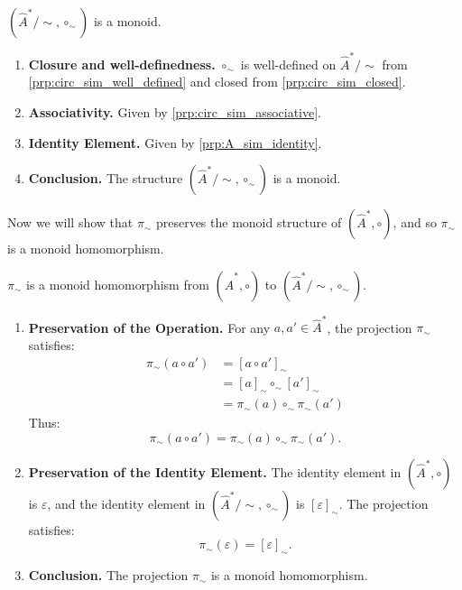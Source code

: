 \begin{propositionE}
\label{prp:A_sim_is_monoid}
    $(\hat{A}^{\ast}/\sim, \circ_{\sim})$ is a monoid.
\end{propositionE}
\begin{proofE}
\begin{enumerate}
    \item \textbf{Closure and well-definedness.}
    $\circ_{\sim}$ is well-defined on $\hat{A}^{\ast}/\sim$ from \cref{prp:circ_sim_well_defined} and closed from \cref{prp:circ_sim_closed}.

    \item \textbf{Associativity.}
    Given by \cref{prp:circ_sim_associative}.

    \item \textbf{Identity Element.}
    Given by \cref{prp:A_sim_identity}.

    \item \textbf{Conclusion.}
    The structure $(\hat{A}^{\ast}/\sim, \circ_{\sim})$ is a monoid.
\end{enumerate}
\end{proofE}


Now we will show that $\pi_{\sim}$ preserves the monoid structure of $(\hat{A}^{\ast}, \circ)$, and so $\pi_{\sim}$ is a monoid homomorphism.

\begin{propositionE}
    $\pi_{\sim}$ is a monoid homomorphism from $(\hat{A}^{\ast}, \circ)$ to $(\hat{A}^{\ast}/\sim, \circ_{\sim})$.
\end{propositionE}
\begin{proofE}
\begin{enumerate}
    \item \textbf{Preservation of the Operation.}
    For any $a, a' \in \hat{A}^{\ast}$, the projection $\pi_{\sim}$ satisfies:
    \begin{align}
      \pi_{\sim}(a \circ a') & = [a \circ a']_{\sim}                 \\
                          & = [a]_{\sim} \circ_{\sim} [a']_{\sim} \\
                          & = \pi_{\sim}(a) \circ_{\sim} \pi_{\sim}(a')
    \end{align}
    Thus:
    \begin{equation}
      \pi_{\sim}(a \circ a') = \pi_{\sim}(a) \circ_{\sim} \pi_{\sim}(a').
    \end{equation}

    \item \textbf{Preservation of the Identity Element.}
    The identity element in $(\hat{A}^{\ast}, \circ)$ is $\varepsilon$, and the identity element in $(\hat{A}^{\ast}/\sim, \circ_{\sim})$ is $[\varepsilon]_{\sim}$.
    The projection satisfies:
    \begin{equation}
      \pi_{\sim}(\varepsilon) = [\varepsilon]_{\sim}.
    \end{equation}

    \item \textbf{Conclusion.}
    The projection $\pi_{\sim}$ is a monoid homomorphism.
\end{enumerate}
\end{proofE}


